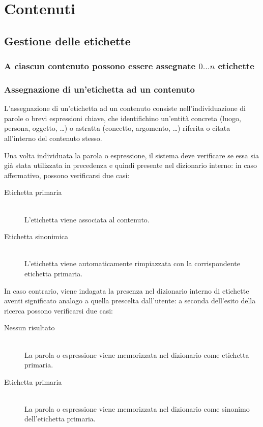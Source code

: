 \documentclass[10pt,a4paper,headinclude,footinclude,hidelinks]{scrreprt} %
\begin{document}
	\section{Contenuti} %
	
	\subsection{Gestione delle etichette}
	\subsubsection{A ciascun contenuto possono essere assegnate $0\ldots n$ etichette}
	\subsubsection{Assegnazione di un'etichetta ad un contenuto}
	L'assegnazione di un'etichetta ad un contenuto consiste nell'individuazione di parole o brevi espressioni chiave, che identifichino un'entità concreta (luogo, persona, oggetto, \ldots) o astratta (concetto, argomento, \ldots) riferita o citata all'interno del contenuto stesso.
	
	Una volta individuata la parola o espressione, il sistema deve verificare se essa sia già stata utilizzata in precedenza e quindi presente nel dizionario interno: in caso affermativo, possono verificarsi due casi:
	\begin{description}
	\item[Etichetta primaria] \hfill \\
	L'etichetta viene associata al contenuto.
	\item[Etichetta sinonimica] \hfill \\
	L'etichetta viene automaticamente rimpiazzata con la corrispondente etichetta primaria.
	\end{description}

	In caso contrario, viene indagata la presenza nel dizionario interno di etichette aventi significato analogo a quella prescelta dall'utente: a seconda dell'esito della ricerca possono verificarsi due casi:
	\begin{description}
	\item[Nessun risultato] \hfill \\
	La parola o espressione viene memorizzata nel dizionario come etichetta primaria.
	\item[Etichetta primaria] \hfill \\
	La parola o espressione viene memorizzata nel dizionario come sinonimo dell'etichetta primaria.
	\end{description}
\end{document}
